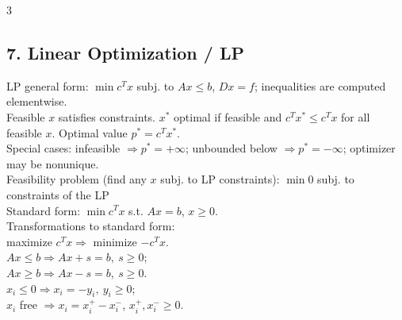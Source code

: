 \documentclass[8pt,landscape]{extarticle}
\newcommand{\1}{\mathbf{1}}
\newcommand{\0}{\mathbf{0}}
\begin{document}
\begin{multicols*}{3}
\subsection*{7. Linear Optimization / LP}
LP general form: $\min c^Tx$ subj. to $Ax\le b$, $Dx=f$; inequalities are computed elementwise. \\
Feasible $x$ satisfies constraints. $x^*$ optimal if feasible and $c^Tx^*\le c^Tx$ for all feasible $x$.
Optimal value $p^*=c^Tx^*$. \\
Special cases: infeasible $\Rightarrow p^*=+\infty$; unbounded below $\Rightarrow p^*=-\infty$; optimizer may be nonunique. \\
Feasibility problem (find any $x$ subj. to LP constraints): $\min 0$ subj. to constraints of the LP\\
Standard form: $\min c^Tx$ s.t. $Ax=b$, $x\ge0$. \\
Transformations to standard form: \\
maximize $c^Tx \Rightarrow$ minimize $-c^Tx$. \\
$Ax\le b \Rightarrow Ax+s=b,\ s\ge0$; \\ 
$Ax\ge b \Rightarrow Ax-s=b,\ s\ge0$. \\
$x_i\le0 \Rightarrow x_i=-y_i,\ y_i\ge0$; \\
$x_i$ free $\Rightarrow x_i=x_i^+-x_i^-$, $x_i^+,x_i^-\ge0$.


\end{multicols*}
\end{document}
